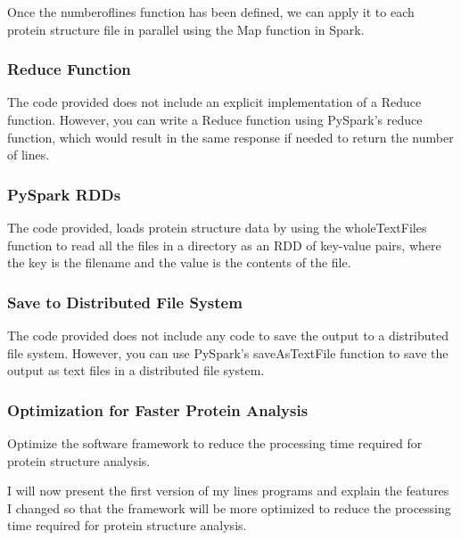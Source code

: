 \documentclass[]{final_report}
\begin{document}
Once the numberoflines function has been defined, we can apply it to each protein structure file in parallel using the Map function in Spark.


\subsubsection{Reduce Function}
The code provided does not include an explicit implementation of a Reduce function. However, you can write a Reduce function using PySpark's reduce function, which would result in the same response if needed to return the number of lines.


\subsubsection{PySpark RDDs}
The code provided, loads protein structure data by using the wholeTextFiles function to read all the files in a directory as an RDD of key-value pairs, where the key is the filename and the value is the contents of the file.

\subsubsection{Save to Distributed File System}
The code provided does not include any code to save the output to a distributed file system. However, you can use PySpark's saveAsTextFile function to save the output as text files in a distributed file system.
\clearpage

\subsubsection{Optimization for Faster Protein Analysis}

\begin{displayquote}
    Optimize the software framework to reduce the processing time required for protein structure analysis.
\end{displayquote}

I will now present the first version of my lines programs and explain the features I changed so that the framework will be more optimized to reduce the processing time required for protein structure analysis.
\end{document}
